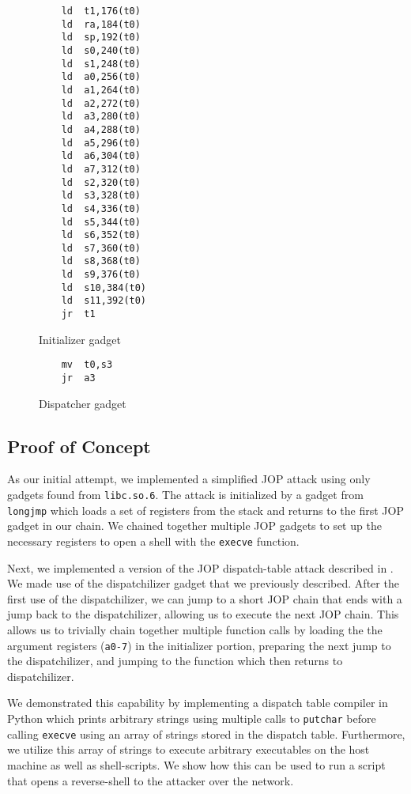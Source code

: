 \begin{figure}
    \caption{Initializer gadget}
    \label{initializer gadget}
    \begin{lstlisting}
    ld	t1,176(t0)
    ld	ra,184(t0)
    ld	sp,192(t0)
    ld	s0,240(t0)
    ld	s1,248(t0)
    ld	a0,256(t0)
    ld	a1,264(t0)
    ld	a2,272(t0)
    ld	a3,280(t0)
    ld	a4,288(t0)
    ld	a5,296(t0)
    ld	a6,304(t0)
    ld	a7,312(t0)
    ld	s2,320(t0)
    ld	s3,328(t0)
    ld	s4,336(t0)
    ld	s5,344(t0)
    ld	s6,352(t0)
    ld	s7,360(t0)
    ld	s8,368(t0)
    ld	s9,376(t0)
    ld	s10,384(t0)
    ld	s11,392(t0)
    jr	t1
    \end{lstlisting}
\end{figure}

\begin{figure}
    \caption{Dispatcher gadget}
    \label{dispatcher gadget}
    \begin{lstlisting}
    mv  t0,s3
    jr  a3
    \end{lstlisting}
\end{figure}

\subsection{Proof of Concept}

As our initial attempt, we implemented a simplified JOP attack using only
gadgets found from \verb|libc.so.6|. The attack is initialized by a gadget from
\verb|longjmp| which loads a set of registers from the stack and returns to the
first JOP gadget in our chain. We chained together multiple JOP gadgets to set
up the necessary registers to open a shell with the \verb|execve| function.

Next, we implemented a version of the JOP dispatch-table attack described in
\cite{bletsch11jopx86}. We made use of the dispatchilizer gadget that we
previously described. After the first use of the dispatchilizer, we can jump to
a short JOP chain that ends with a jump back to the dispatchilizer, allowing us
to execute the next JOP chain. This allows us to trivially chain together
multiple function calls by loading the the argument registers (\verb|a0-7|) in
the initializer portion, preparing the next jump to the dispatchilizer, and
jumping to the function which then returns to dispatchilizer. 

We demonstrated this capability by implementing a dispatch table compiler in
Python which prints arbitrary strings using multiple calls to \verb|putchar|
before calling \verb|execve| using an array of strings stored in the dispatch
table. Furthermore, we utilize this array of strings to execute arbitrary
executables on the host machine as well as shell-scripts. We show how this can
be used to run a script that opens a reverse-shell to the attacker over the
network.

